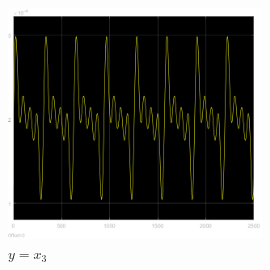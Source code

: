 \documentclass{article}
\begin{document}
\begin{figure}[!h]
    \centering
     \includegraphics[width=0.6\textwidth]{grafici/x3_2.png}
     \caption*{$y=x_3$}
\end{figure}
\end{document}
